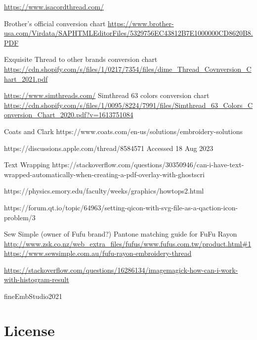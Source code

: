 \documentclass[10pt]{report}
\begin{document}
\url{https://www.isacordthread.com/}

Brother's official conversion chart
\url{https://www.brother-usa.com/Virdata/SAPHTMLEditorFiles/5329756EC43812B7E1000000CD8620B8.PDF}

Exquisite Thread to other brands conversion chart
\url{https://cdn.shopify.com/s/files/1/0217/7354/files/dime_Thread_Covnversion_Chart_2021.pdf}

\url{https://www.simthreads.com/}
Simthread 63 colors conversion chart
\url{https://cdn.shopify.com/s/files/1/0095/8224/7991/files/Simthread_63_Colors_Conversion_Chart_2020.pdf?v=1613751084}

Coats and Clark https://www.coats.com/en-us/solutions/embroidery-solutions

https://discussions.apple.com/thread/8584571 Accessed 18 Aug 2023

Text Wrapping
https://stackoverflow.com/questions/30350946/can-i-have-text-wrapped-automatically-when-creating-a-pdf-overlay-with-ghostscri

https://physics.emory.edu/faculty/weeks/graphics/howtops2.html

https://forum.qt.io/topic/64963/setting-qicon-with-svg-file-as-a-qaction-icon-problem/3

Sew Simple (owner of Fufu brand?) Pantone matching guide for FuFu Rayon
\url{http://www.zsk.co.nz/web_extra_files/fufus/www.fufus.com.tw/product.html#1}
\url{https://www.sewsimple.com.au/fufu-rayon-embroidery-thread}

\url{https://stackoverflow.com/questions/16286134/imagemagick-how-can-i-work-with-histogram-result}

fineEmbStudio2021




\appendix



\chapter{License}



\printindex
\end{document}
